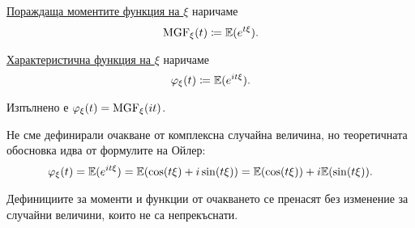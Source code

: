 \documentclass[numbers=endperiod, DIV=15, bibliography=totocnumbered]{scrartcl}
\begin{document}
\begin{definition}
  \uline{Пораждаща моментите функция на $\xi$} наричаме
  \begin{displaymath}
    \operatorname{MGF}_\xi (t) \coloneqq \mathbb{E}(e^{t\xi}).
  \end{displaymath}

  \uline{Характеристична функция на $\xi$} наричаме
  \begin{displaymath}
    \varphi_\xi (t) \coloneqq \mathbb{E}(e^{it\xi}).
  \end{displaymath}

  Изпълнено е $\varphi_\xi(t) = \operatorname{MGF}_\xi(it)$.
\end{definition}

\begin{note}
  Не сме дефинирали очакване от комплексна случайна величина, но теоретичната обосновка идва от формулите на Ойлер:
  \begin{displaymath}
    \varphi_\xi (t)
    =
    \mathbb{E}(e^{it\xi})
    =
    \mathbb{E}(\cos(t\xi) + i\sin(t\xi))
    =
    \mathbb{E}(\cos(t\xi)) + i \mathbb{E}(\sin(t\xi)).
  \end{displaymath}
\end{note}

\begin{note}
  Дефинициите за моменти и функции от очакването се пренасят без изменение за случайни величини, които не са непрекъснати.
\end{note}
\end{document}
